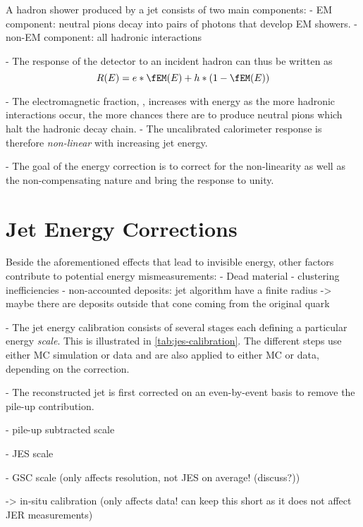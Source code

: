 A hadron shower produced by a jet consists of two main components:
- EM component: neutral pions decay into pairs of photons that develop EM showers.
- non-EM component: all hadronic interactions

- The response of the detector to an incident hadron can thus be written as
\begin{equation}
    R(E) = e*\fEM(E) + h * \left(1 - \fEM(E)\right)
\end{equation}


- The electromagnetic fraction, \fEM, increases with energy as the more hadronic interactions occur, the more chances there are to produce neutral pions which halt the hadronic decay chain.
- The uncalibrated calorimeter response is therefore \emph{non-linear} with increasing jet energy.

- The goal of the energy correction is to correct for the non-linearity as well as the non-compensating nature and bring the response to unity.


\section{Jet Energy Corrections}
\label{sec:jes-calibration}
Beside the aforementioned effects that lead to invisible energy, other factors contribute to potential energy mismeasurements:
- Dead material
- clustering inefficiencies
- non-accounted deposits: jet algorithm have a finite radius -> maybe there are deposits outside that cone coming from the original quark

- The jet energy calibration consists of several stages each defining a particular energy \emph{scale}. This is illustrated in \cref{tab:jes-calibration}.
The different steps use either MC simulation or data and are also applied to either MC or data, depending on the correction.

- The reconstructed jet \pT is first corrected on an even-by-event basis to remove the pile-up contribution.

- pile-up subtracted scale

- JES scale

- GSC scale (only affects resolution, not JES on average! (discuss?))

-> in-situ calibration (only affects data! can keep this short as it does not affect JER measurements)

